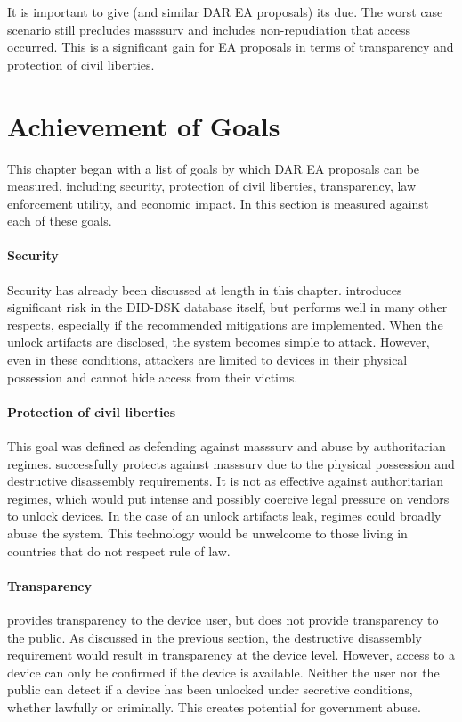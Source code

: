 It is important to give \ldawmsr (and similar \ac{DAR} \ac{EA} proposals) its due. The worst case scenario still
precludes \ac{masssurv} and includes non-repudiation that access occurred. This is a significant gain for \ac{EA}
proposals in terms of transparency and protection of civil liberties.


\section{Achievement of Goals}

This chapter began with a list of goals by which \ac{DAR} \ac{EA} proposals can be measured, including security,
protection of civil liberties, transparency, law enforcement utility, and economic impact. In this section \ldawmsr is
measured against each of these goals.

\paragraph*{Security} Security has already been discussed at length in this chapter. \ldawmsr introduces significant
risk in the DID-DSK database itself, but performs well in many other respects, especially if the recommended mitigations
are implemented. When the unlock artifacts are disclosed, the system becomes simple to attack. However, even in these
conditions, attackers are limited to devices in their physical possession and cannot hide access from their victims.

\paragraph*{Protection of civil liberties} This goal was defined as defending against \ac{masssurv} and abuse by
authoritarian regimes. \ldawmsr successfully protects against \ac{masssurv} due to the physical possession and
destructive disassembly requirements. It is not as effective against authoritarian regimes, which would put intense and
possibly coercive legal pressure on vendors to unlock devices. In the case of an unlock artifacts leak, regimes could
broadly abuse the system. This technology would be unwelcome to those living in countries that do not respect rule of
law.

\paragraph*{Transparency} \ldawmsr provides transparency to the device user, but does not provide transparency to the
public. As discussed in the previous section, the destructive disassembly requirement would result in transparency at
the device level. However, access to a device can only be confirmed if the device is available. Neither the user nor the
public can detect if a device has been unlocked under secretive conditions, whether lawfully or criminally. This creates
potential for government abuse.

